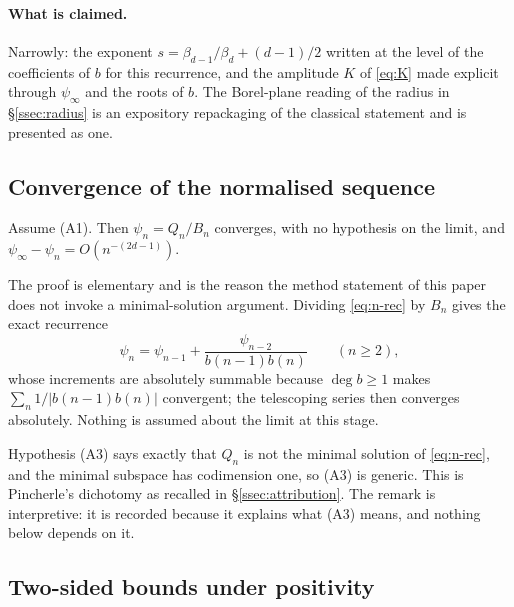 \paragraph{What is claimed.} Narrowly: the exponent
$s=\beta_{d-1}/\beta_d+(d-1)/2$ written at the level of the coefficients of $b$
for this recurrence, and the amplitude $K$ of \eqref{eq:K} made explicit through
$\psi_\infty$ and the roots of $b$. The Borel-plane reading of the radius in
\S\ref{ssec:radius} is an expository repackaging of the classical statement and
is presented as one.

\subsection{Convergence of the normalised sequence}\label{ssec:convergence}

\begin{proposition}\label{prop:exists}
Assume (A1). Then $\psi_n=Q_n/B_n$ converges, with no hypothesis on the limit,
and $\psi_\infty-\psi_n=O(n^{-(2d-1)})$.
\end{proposition}

The proof is elementary and is the reason the method statement of this paper
does not invoke a minimal-solution argument. Dividing \eqref{eq:n-rec} by $B_n$
gives the exact recurrence
\begin{equation}\label{eq:psi-rec}
  \psi_n=\psi_{n-1}+\frac{\psi_{n-2}}{b(n-1)b(n)}\qquad(n\ge2),
\end{equation}
whose increments are absolutely summable because $\deg b\ge1$ makes
$\sum_n 1/|b(n-1)b(n)|$ convergent; the telescoping series then converges
absolutely. Nothing is assumed about the limit at this stage.

\begin{remark}\label{rem:pincherle}
Hypothesis (A3) says exactly that $Q_n$ is not the minimal solution of
\eqref{eq:n-rec}, and the minimal subspace has codimension one, so (A3) is
generic. This is Pincherle's dichotomy as recalled in \S\ref{ssec:attribution}.
The remark is interpretive: it is recorded because it explains what (A3) means,
and nothing below depends on it.
\end{remark}

\subsection{Two-sided bounds under positivity}\label{ssec:bounds}

